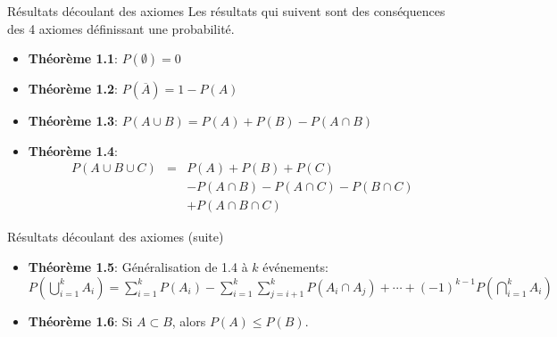 \documentclass{BeamerTemplate}
\begin{document}
\begin{frame}[t]{Résultats découlant des axiomes}
Les résultats qui suivent sont des conséquences des 4 axiomes
définissant une probabilité. 

 \begin{itemize}
  \item<1->{\bf Théorème 1.1}: $P(\emptyset)=0$

  {\color{gray}{[$S$ et $\emptyset$ sont mutuellement
  exclusifs, $S\cup\emptyset=S$ et $P(S)=1$ ...]}}
  \item<2->{\bf Théorème 1.2}: $P(\overline{A})=1-P(A)$

  {\color{gray}{[$A$ et $\overline{A}$ sont mutuellement
  exclusifs et $S=A\cup\overline{A}$ ...]}}
  \item<3->{\bf Théorème 1.3}: $P(A\cup B)=P(A)+P(B)-P(A\cap B)$

  \item<4->{\bf Théorème 1.4}:
  $$\begin{array}{lll}
  P(A\cup B\cup C)&=&P(A)+P(B)+P(C)\\&&-P(A\cap B)
   -P(A\cap C)-P(B\cap C)\\&&+P(A\cap B\cap C)\end{array}$$

 \end{itemize}
\end{frame}

\begin{frame}[t]{Résultats découlant des axiomes (suite)}
 \begin{itemize}\itemsep6mm
  \item<1->{\bf Théorème 1.5}: Généralisation de 1.4 à $k$ événements:
     \\
$P\left(\bigcup\limits_{i=1}^kA_i\right)=\sum\limits_{i=1}^kP(A_i)
  -\sum\limits_{i=1}^k\sum\limits_{j=i+1}^kP(A_i\cap A_j)+\cdots+(-1)^{k-1}P\left(\bigcap\limits_{i=1}^kA_i\right)$

  \item<2->{\bf Théorème 1.6}: Si $A\subset B$, alors $P(A)\le P(B)$.

  {\small \color{gray}{[$B=(\overline{A}\cap B)\cup A$, et $(\overline{A}\cap B)$ et $A$ sont mutuellement exclusifs ...]}}
 \end{itemize}
\end{frame}
\end{document}
